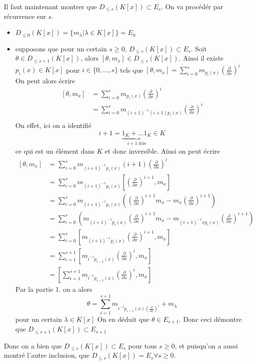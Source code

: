 \documentclass[french]{article}
\newcommand{\mdx}[1]{\left(\frac{\partial}{\partial x}\right)^{#1}}
\newcommand{\DK}[1]{D_{\leq #1} (K[x])}
\newcommand{\lie}[2]{\left[#1, #2\right]}
\begin{document}
\begin{enumerate}
		Il faut maintenant montrer que $\DK{s} \subset E_s$.
		On va procédér par récurrence sur $s$.
		\begin{itemize}
			\item $\DK{0} = \{m_\lambda | \lambda \in K[x]\} = E_0$
			\item supposons que pour un certain $s \geq 0$,
				$\DK{s} \subset E_s$.
				Soit $\theta \in \DK{s + 1}$, alors
				$\lie{\theta}{m_x} \in \DK{s}$. Ainsi il existe
				$p_i(x) \in K[x]$ pour $i \in \{0, \dots, s\}$
				tels que $\lie{\theta}{m_x} =
				\sum_{i=0}^{s}m_{p_i(x)}\mdx{i}$
				On peut alors écrire
				\begin{align*}
					\lie{\theta}{m_x}
					&= \sum_{i=0}^{s}m_{p_i(x)}\mdx{i}\\
					&= \sum_{i=0}^{s}m_{(i+1)^{-1}(i+1)p_i(x)}\mdx{i}\\
				\end{align*}
				On effet, ici on a identifié
				\begin{equation*}
					i+1 = \underbrace{1_K + \dots 1_K}_{i+1\text{ fois}} \in K
				\end{equation*}
				ce qui est un élément dans $K$ et donc inversible. Ainsi on peut
				écrire
				\begin{align*}
					\lie{\theta}{m_x}
					&= \sum_{i=0}^{s}m_{(i+1)^{-1}p_i(x)}(i+1)\mdx{i}\\
					&= \sum_{i=0}^{s}m_{(i+1)^{-1}p_i(x)}\lie{\mdx{i+1}}{m_x}\\
					&= \sum_{i=0}^{s}m_{(i+1)^{-1}p_i(x)}
					\left(\mdx{i+1}m_x - m_x\mdx{i+1}\right)\\
					&= \sum_{i=0}^{s}\left(m_{(i+1)^{-1}p_i(x)}\mdx{i+1}m_x
					- m_{(i+1)^{-1}xp_i(x)}\mdx{i+1}\right)\\
					&= \sum_{i=0}^s \lie{m_{(i+1)^{-1}p_i(x)}\mdx{i+1}}{m_x}\\
					&= \sum_{i=1}^{s+1} \lie{m_{i^{-1}p_{i - 1}(x)}\mdx{i}}{m_x}\\
					&= \lie{\sum_{i=1}^{s+1}m_{i^{-1}p_{i - 1}(x)}\mdx{i}}{m_x}
				\end{align*}
				Par la partie 1. on a alors
				\begin{equation*}
					\theta = \sum_{i=1}^{s+1}m_{i^{-1}p_{i-1}(x)\mdx{i}}
					+ m_{\lambda}
				\end{equation*}
				pour un certain $\lambda \in K[x]$
				On en déduit que $\theta \in E_{s+1}$.
				Donc ceci démontre que $\DK{s+1} \subset E_{s+1}$
		\end{itemize}
		Donc on a bien que $\DK{s} \subset E_{s}$ pour tous $s\geq 0$,
		et puisqu'on a aussi montré l'autre inclusion, que
		$\DK{s} = E_s \forall s\geq 0$.


\end{enumerate}
\end{document}
